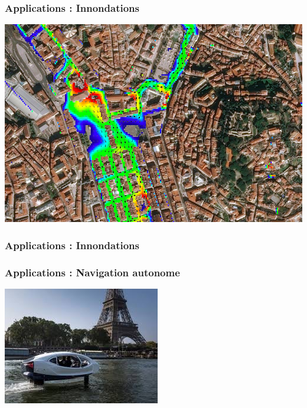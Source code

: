 \begin{frame}
	\frametitle{Applications : Innondations}
	\centering
	\includegraphics[scale=0.3]{Files/fig/SurfaceVelocity.png}
\end{frame}


\begin{frame}
	\frametitle{Applications : Innondations}
	\centering
\end{frame}

\begin{frame}
	\frametitle{Applications : Navigation autonome}
	\centering
	\includegraphics[scale=1]{Files/fig/taxi_autonome.png}
\end{frame}

